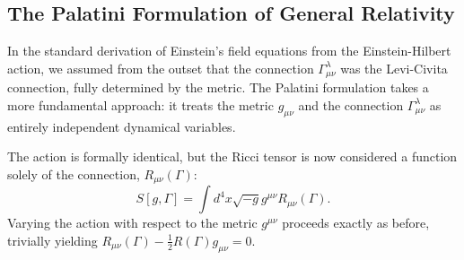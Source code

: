 \documentclass[11pt, a4paper]{report}
\begin{document}
\subsection{The Palatini Formulation of General Relativity}

In the standard derivation of Einstein's field equations from the Einstein-Hilbert action, we assumed from the outset that the connection $\Gamma^{\lambda}_{\mu\nu}$ was the Levi-Civita connection, fully determined by the metric. The Palatini formulation takes a more fundamental approach: it treats the metric $g_{\mu\nu}$ and the connection $\Gamma^{\lambda}_{\mu\nu}$ as entirely independent dynamical variables. 

The action is formally identical, but the Ricci tensor is now considered a function solely of the connection, $R_{\mu\nu}(\Gamma)$:
\begin{equation}
S[g, \Gamma] = \int d^{4}x \sqrt{-g} g^{\mu\nu} R_{\mu\nu}(\Gamma).
\end{equation}
Varying the action with respect to the metric $g^{\mu\nu}$ proceeds exactly as before, trivially yielding $R_{\mu\nu}(\Gamma) - \frac{1}{2}R(\Gamma) g_{\mu\nu} = 0$.
\end{document}
